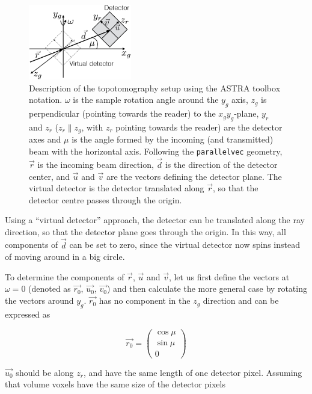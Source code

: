 \documentclass[11pt]{scrartcl}
\begin{document}
\begin{figure}[h]
    \centering
    \includegraphics[width=0.4\textwidth]{geom_setup.png}
    \caption{Description of the topotomography setup using the {\footnotesize{ASTRA}} toolbox notation. $\omega$ is the sample rotation angle around the $y_g$ axis, $z_g$ is perpendicular (pointing towards the reader) to the $x_gy_g$-plane, $y_r$ and $z_r$ ($z_r \parallel z_g$, with $z_r$ pointing towards the reader) are the detector axes and $\mu$ is the angle formed by the incoming (and transmitted) beam with the horizontal axis. Following the {\texttt{parallel\textunderscore vec}} geometry, ${\vec{r}}$ is the incoming beam direction, ${\vec{d}}$ is the direction of the detector center, and ${\vec{u}}$ and ${\vec{v}}$ are the vectors defining the detector plane. The virtual detector is the detector translated along $\vec{r}$, so that the detector centre passes through the origin.}
    \label{fig:geom_setup}
\end{figure}

Using a ``virtual detector'' approach, the detector can be translated along the ray direction, so that the detector plane goes through the origin. In this way, all components of ${\vec{d}}$ can be set to zero, since the virtual detector now spins instead of moving around in a big circle.

To determine the components of ${\vec{r}}$, ${\vec{u}}$ and ${\vec{v}}$, let us first define the vectors at $\omega = 0$ (denoted as ${\vec{r_0}}$, ${\vec{u_0}}$, ${\vec{v_0}}$) and then calculate the more general case by rotating the vectors around $y_g$. ${\vec{r_0}}$ has no component in the $z_g$ direction and can be expressed as

\begin{equation}
{\vec{r_0}} = \left(\begin{matrix}
\cos\mu\\ \sin \mu\\ 0
\end{matrix}\right)
\end{equation}

${\vec{u_0}}$ should be along $z_r$, and have the same length of one detector pixel. Assuming that volume voxels have the same size of the detector pixels
\end{document}
